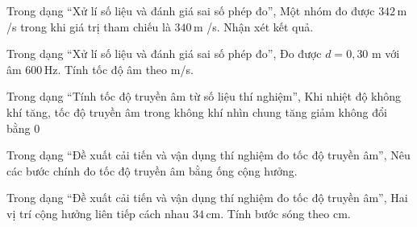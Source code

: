\begin{ex}
Trong dạng “Xử lí số liệu và đánh giá sai số phép đo”, Một nhóm đo được $342\,\text{m}$ /s trong khi giá trị tham chiếu là $340\,\text{m}$ /s. Nhận xét kết quả.
\choiceTF

\end{ex}

\begin{ex}
Trong dạng “Xử lí số liệu và đánh giá sai số phép đo”, Đo được $d=0,30$ m với âm $600\,\text{Hz}$. Tính tốc độ âm theo m/s.
\end{ex}

\begin{ex}
Trong dạng “Tính tốc độ truyền âm từ số liệu thí nghiệm”, Khi nhiệt độ không khí tăng, tốc độ truyền âm trong không khí nhìn chung
\choice
{\True tăng}
{giảm}
{không đổi}
{bằng 0}
\end{ex}

\begin{ex}
Trong dạng “Đề xuất cải tiến và vận dụng thí nghiệm đo tốc độ truyền âm”, Nêu các bước chính đo tốc độ truyền âm bằng ống cộng hưởng.
\choiceTF

\end{ex}

\begin{ex}
Trong dạng “Đề xuất cải tiến và vận dụng thí nghiệm đo tốc độ truyền âm”, Hai vị trí cộng hưởng liên tiếp cách nhau $34\,\text{cm}$. Tính bước sóng theo cm.
\end{ex}

